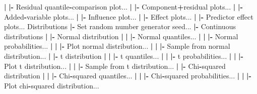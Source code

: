 \documentclass[12pt,]{krantz}
\newenvironment{Shaded}{\begin{snugshade}}{\end{snugshade}}
\newcommand{\ErrorTok}[1]{\textcolor[rgb]{0.64,0.00,0.00}{\textbf{#1}}}
\newcommand{\NormalTok}[1]{#1}
\newcommand{\OperatorTok}[1]{\textcolor[rgb]{0.81,0.36,0.00}{\textbf{#1}}}
\newcommand{\StringTok}[1]{\textcolor[rgb]{0.31,0.60,0.02}{#1}}
\begin{document}
\begin{Shaded}
\begin{Highlighting}[]
  \OperatorTok{|}\StringTok{ }\ErrorTok{|}\OperatorTok{-}\StringTok{ }\NormalTok{Residual quantile}\OperatorTok{-}\NormalTok{comparison plot...}
  \OperatorTok{|}\StringTok{ }\ErrorTok{|}\OperatorTok{-}\StringTok{ }\NormalTok{Component}\OperatorTok{+}\NormalTok{residual plots...}
  \OperatorTok{|}\StringTok{ }\ErrorTok{|}\OperatorTok{-}\StringTok{ }\NormalTok{Added}\OperatorTok{-}\NormalTok{variable plots...}
  \OperatorTok{|}\StringTok{ }\ErrorTok{|}\OperatorTok{-}\StringTok{ }\NormalTok{Influence plot...}
  \OperatorTok{|}\StringTok{ }\ErrorTok{|}\OperatorTok{-}\StringTok{ }\NormalTok{Effect plots...}
  \OperatorTok{|}\StringTok{ }\ErrorTok{|}\OperatorTok{-}\StringTok{ }\NormalTok{Predictor effect plots...}
\NormalTok{Distributions}
  \OperatorTok{|-}\StringTok{ }\NormalTok{Set random number generator seed...}
  \OperatorTok{|-}\StringTok{ }\NormalTok{Continuous distributions}
  \OperatorTok{|}\StringTok{ }\ErrorTok{|}\OperatorTok{-}\StringTok{ }\NormalTok{Normal distribution}
  \OperatorTok{|}\StringTok{ }\ErrorTok{|}\StringTok{ }\ErrorTok{|}\OperatorTok{-}\StringTok{ }\NormalTok{Normal quantiles...}
  \OperatorTok{|}\StringTok{ }\ErrorTok{|}\StringTok{ }\ErrorTok{|}\OperatorTok{-}\StringTok{ }\NormalTok{Normal probabilities...}
  \OperatorTok{|}\StringTok{ }\ErrorTok{|}\StringTok{ }\ErrorTok{|}\OperatorTok{-}\StringTok{ }\NormalTok{Plot normal distribution...}
  \OperatorTok{|}\StringTok{ }\ErrorTok{|}\StringTok{ }\ErrorTok{|}\OperatorTok{-}\StringTok{ }\NormalTok{Sample from normal distribution...}
  \OperatorTok{|}\StringTok{ }\ErrorTok{|}\OperatorTok{-}\StringTok{ }\NormalTok{t distribution}
  \OperatorTok{|}\StringTok{ }\ErrorTok{|}\StringTok{ }\ErrorTok{|}\OperatorTok{-}\StringTok{ }\NormalTok{t quantiles...}
  \OperatorTok{|}\StringTok{ }\ErrorTok{|}\StringTok{ }\ErrorTok{|}\OperatorTok{-}\StringTok{ }\NormalTok{t probabilities...}
  \OperatorTok{|}\StringTok{ }\ErrorTok{|}\StringTok{ }\ErrorTok{|}\OperatorTok{-}\StringTok{ }\NormalTok{Plot t distribution...}
  \OperatorTok{|}\StringTok{ }\ErrorTok{|}\StringTok{ }\ErrorTok{|}\OperatorTok{-}\StringTok{ }\NormalTok{Sample from t distribution...}
  \OperatorTok{|}\StringTok{ }\ErrorTok{|}\OperatorTok{-}\StringTok{ }\NormalTok{Chi}\OperatorTok{-}\NormalTok{squared distribution}
  \OperatorTok{|}\StringTok{ }\ErrorTok{|}\StringTok{ }\ErrorTok{|}\OperatorTok{-}\StringTok{ }\NormalTok{Chi}\OperatorTok{-}\NormalTok{squared quantiles...}
  \OperatorTok{|}\StringTok{ }\ErrorTok{|}\StringTok{ }\ErrorTok{|}\OperatorTok{-}\StringTok{ }\NormalTok{Chi}\OperatorTok{-}\NormalTok{squared probabilities...}
  \OperatorTok{|}\StringTok{ }\ErrorTok{|}\StringTok{ }\ErrorTok{|}\OperatorTok{-}\StringTok{ }\NormalTok{Plot chi}\OperatorTok{-}\NormalTok{squared distribution...}

\end{Highlighting}
\end{Shaded}
\end{document}
